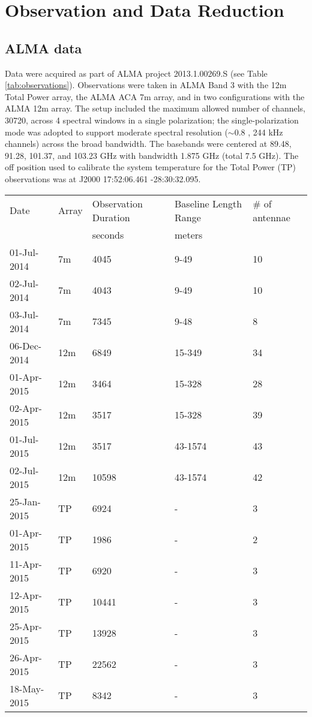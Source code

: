 \documentclass[twocolumn]{aastex61}
\begin{document}
\section{Observation and Data Reduction}
\label{sec:observations}
\subsection{ALMA data}
Data were acquired as part of ALMA project 2013.1.00269.S (see Table
\ref{tab:observations}).  Observations were taken in ALMA Band 3 with the 12m
Total Power array, the ALMA ACA 7m array, and in two
configurations with the ALMA 12m array.  The setup included the maximum allowed
number of channels, 30720, across 4 spectral windows in a single polarization;
the single-polarization mode was adopted to support moderate spectral
resolution ($\sim0.8$ \kms, 244 kHz channels) across the broad bandwidth.  The
basebands were centered at 89.48, 91.28, 101.37, and 103.23 GHz with bandwidth
1.875 GHz (total 7.5 GHz).  The off position used to calibrate the system
temperature for the Total Power (TP) observations was at J2000 17:52:06.461
-28:30:32.095.


\begin{table*}[htp]
\centering
\caption{Observation Summary}
\begin{tabular}{lllll}
\label{tab:observations}
Date & Array & Observation Duration &  Baseline Length Range  & \# of antennae\\
     &       & seconds              & meters                    & \\
\hline
01-Jul-2014 & 7m & 4045 & 9-49 & 10\\
02-Jul-2014 & 7m & 4043 & 9-49 & 10\\
03-Jul-2014 & 7m & 7345 & 9-48 & 8\\
06-Dec-2014 & 12m & 6849 & 15-349 & 34\\
01-Apr-2015 & 12m & 3464 & 15-328 & 28\\
02-Apr-2015 & 12m & 3517 & 15-328 & 39\\
01-Jul-2015 & 12m & 3517 & 43-1574 & 43\\
02-Jul-2015 & 12m & 10598 & 43-1574 & 42\\

\hline

25-Jan-2015 & TP & 6924  & - & 3\\
01-Apr-2015 & TP & 1986  & - & 2\\
11-Apr-2015 & TP & 6920  & - & 3\\
12-Apr-2015 & TP & 10441 & - & 3\\
25-Apr-2015 & TP & 13928 & - & 3\\
26-Apr-2015 & TP & 22562 & - & 3\\
18-May-2015 & TP & 8342  & - & 3\\
\hline
\end{tabular}
\end{table*}
\end{document}
